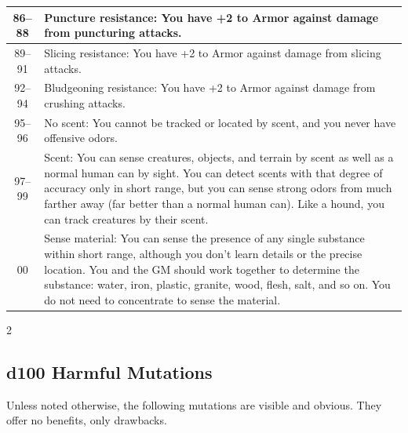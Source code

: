 \begin{longtable}{| c | p{15cm} |}
86–88 & Puncture resistance: You have +2 to Armor against damage from puncturing attacks. \\ \hline
89–91 & Slicing resistance: You have +2 to Armor against damage from slicing attacks. \\ \hline
92–94 & Bludgeoning resistance: You have +2 to Armor against damage from crushing attacks. \\ \hline
95–96 & No scent: You cannot be tracked or located by scent, and you never have offensive odors. \\ \hline
97–99 & Scent: You can sense creatures, objects, and terrain by scent as well as a normal human can by sight. You can detect scents with that degree of accuracy only in short range, but you can sense strong odors from much farther away (far better than a normal human can). Like a hound, you can track creatures by their scent.\\ \hline
00 & Sense material: You can sense the presence of any single substance within short range, although you don’t learn details or the precise location. You and the GM should work together to determine the substance: water, iron, plastic, granite, wood, flesh, salt, and so on. You do not need to concentrate to sense the material. \\ \hline

\end{longtable}

\begin{multicols}{2}

\subsection{d100 Harmful Mutations}

Unless noted otherwise, the following mutations are visible and obvious. They offer no benefits, only drawbacks.

\end{multicols}

